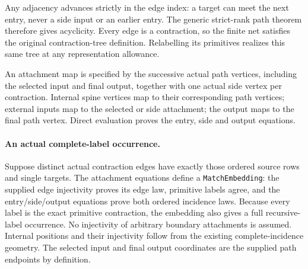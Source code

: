 \par{}
\par{}
\par{}
\par{}

Any adjacency advances strictly in the edge index: a target can meet the
next entry, never a side input or an earlier entry. The generic strict-rank
path theorem therefore gives acyclicity. Every edge is a contraction, so the
finite net satisfies the original contraction-tree definition. Relabelling
its primitives realizes this same tree at any representation allowance.

An attachment map is specified by the successive actual path vertices,
including the selected input and final output, together with one actual side
vertex per contraction. Internal spine vertices map to their corresponding
path vertices; external inputs map to the selected or side attachment; the
output maps to the final path vertex. Direct evaluation proves the entry,
side and output equations.

\par{}
\par{}

\paragraph{An actual complete-label occurrence.}
Suppose distinct actual contraction edges have exactly those ordered source
rows and single targets. The attachment equations define a
\texttt{MatchEmbedding}: the supplied edge injectivity proves its edge law,
primitive labels agree, and the entry/side/output equations prove both
ordered incidence laws. Because every label is the exact primitive
contraction, the embedding also gives a full recursive-label occurrence.
No injectivity of arbitrary boundary attachments is assumed. Internal
positions and their injectivity follow from the existing complete-incidence
geometry. The selected input and final output coordinates are the supplied
path endpoints by definition.

